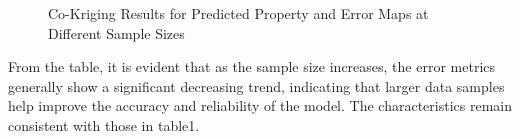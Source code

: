 \documentclass{swmcmthesis}
\begin{document}
\begin{figure}[h!t]

\caption{Co-Kriging Results for Predicted Property and Error Maps at Different Sample Sizes}
\label{fig:all_samples_co_kriging}
\end{figure}

From the table, it is evident that as the sample size increases, the error metrics generally show a significant decreasing trend, indicating that larger data samples help improve the accuracy and reliability of the model. The characteristics remain consistent with those in table1.
\end{document}
